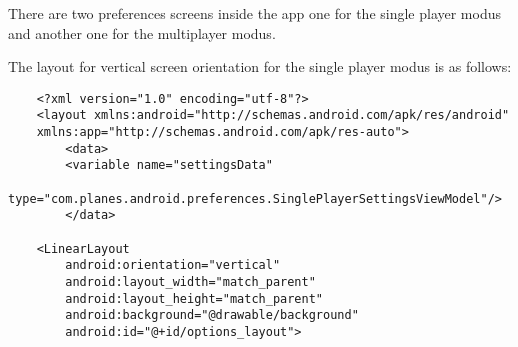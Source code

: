There are two preferences screens inside the app one for the single player modus and another one for the multiplayer modus. 

The layout for vertical screen orientation for the single player modus is as follows:

\begin{lstlisting}
	<?xml version="1.0" encoding="utf-8"?>
	<layout xmlns:android="http://schemas.android.com/apk/res/android"
	xmlns:app="http://schemas.android.com/apk/res-auto">
		<data>
		<variable name="settingsData"
		type="com.planes.android.preferences.SinglePlayerSettingsViewModel"/>
		</data>
	
	<LinearLayout
		android:orientation="vertical"
		android:layout_width="match_parent"
		android:layout_height="match_parent"
		android:background="@drawable/background"
		android:id="@+id/options_layout">
		

\end{lstlisting}
